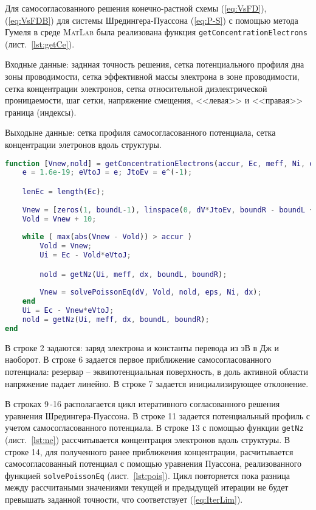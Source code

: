 Для самосогласованного решения конечно-растной схемы (\ref{eq:VsFD}), (\ref{eq:VsFDB}) для системы Шредингера-Пуассона (\ref{eq:P-S}) с помощью метода Гумеля в среде \textsc{MatLab} была реализована функция \texttt{getConcentrationElectrons} (лист.~\ref{lst:getCe}).

Входные данные: заднная точность решения, сетка потенциального профиля дна зоны проводимости, сетка эффективной массы электрона в зоне проводимости, сетка концентрации электронов, сетка относительной диэлектрической проницаемости, шаг сетки, напряжение смещения, <<левая>> и <<правая>> граница (индексы).

Выходыне данные: сетка профиля самосогласованного потенциала, сетка концентрации элетронов вдоль структуры.

\begin{lstlisting}[style=realcode,language=Matlab,caption={Самосогласовванное решение уравнения Шредингера-Пуассона},label={lst:getCe}]
function [Vnew,nold] = getConcentrationElectrons(accur, Ec, meff, Ni, eps, dx, dV, boundL, boundR)
	e = 1.6e-19; eVtoJ = e; JtoEv = e^(-1); 	

	lenEc = length(Ec);
	
	Vnew = [zeros(1, boundL-1), linspace(0, dV*JtoEv, boundR - boundL + 1), dV*JtoEv*ones(1, lenEc - boundR)];
	Vold = Vnew + 10;
	
	while ( max(abs(Vnew - Vold)) > accur )
		Vold = Vnew;
		Ui = Ec - Vold*eVtoJ;

		nold = getNz(Ui, meff, dx, boundL, boundR);
        
        Vnew = solvePoissonEq(dV, Vold, nold, eps, Ni, dx);
	end
	Ui = Ec - Vnew*eVtoJ;
	nold = getNz(Ui, meff, dx, boundL, boundR);
end
\end{lstlisting}
В строке 2 задаются: заряд электрона и константы перевода из эВ в Дж и наоборот. В строке 6 задается первое приближение самосогласованного потенциала: резервар -- эквипотенциальная поверхность, в доль активной области напряжение падает линейно. В строке 7 задается инициализирующее отклонение.

В строках 9\,-16 располагается цикл итеративного согласованного решения уравнения Шредингера-Пуассона. В строке 11 задается потенциальный профиль с учетом самосогласованного потенциала. В строке 13 с помощью функции \texttt{getNz} (лист.~\ref{lst:ne}) рассчитывается концентрация электронов вдоль структуры. В строке 14, для полученного ранее приближения концентрации, расчитывается самосогласованный потенциал с помощью уравнения Пуассона, реализованного функцией \texttt{solvePoissonEq} (лист.~\ref{lst:pois}). Цикл повторяется пока разница между рассчитаными значениями текущей и предыдущей итерации не будет превышать заданной точности, что соответствует (\ref{eq:IterLim}).

